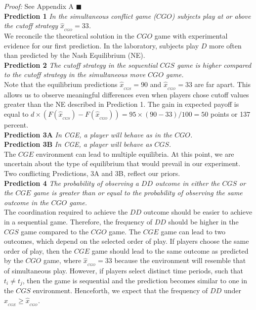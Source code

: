 \documentclass[11pt, letterpaper]{article}
\theoremstyle{plain}
\begin{document}
\noindent \textit{Proof:} See Appendix A $\blacksquare$
\\

\noindent \textbf{Prediction 1}
\textit{In the simultaneous conflict game ($CGO$) subjects play at or above the cutoff strategy $\hat{x}_{_{CGO}}=33$.}\\

We reconcile the theoretical solution in the $CGO$ game with experimental evidence for our first prediction. In the laboratory, subjects play $D$ more often than predicted by the Nash Equilibrium (NE). \\

\noindent \textbf{Prediction 2}
\textit{The cutoff strategy in the sequential $CGS$ game is higher compared to the cutoff strategy in the simultaneous move $CGO$ game.}\\

Note that the equilibrium predictions $\hat{x}_{_{CGS}}=90$ and $\hat{x}_{_{CGO}}=33$ are far apart. This allows us to observe meaningful differences even when players chose cutoff values greater than the NE described in Prediction 1. The gain in expected payoff is equal to $d\times \left( F(\hat{x}_{_{CGS}})-F(\hat{x}_{_{CGO}}) \right)=95\times( 90-33)/100=50$ points or 137 percent. \\

\noindent \textbf{Prediction 3A} \textit{In CGE, a player will behave as in the $CGO$. }\\
\noindent \textbf{Prediction 3B} \textit{In CGE, a player will behave as $CGS$.}\\

The $CGE$ environment can lead to multiple equilibria. At this point, we are uncertain about the type of equilibrium that would prevail in our experiment. Two conflicting Predictions, 3A and 3B, reflect our priors. \\

\noindent \textbf{Prediction 4}
\textit{The probability of observing a $DD$ outcome in either the $CGS$ or the $CGE$ game is greater than or equal to the probability of observing the same outcome in the $CGO$ game.}\\

The coordination required to achieve the $DD$ outcome should be easier to achieve in a sequential game. Therefore, the frequency of $DD$ should be higher in the $CGS$ game compared to the $CGO$ game. The $CGE$ game can lead to two outcomes, which depend on the selected order of play. If players choose the same order of play, then the $CGE$ game should lead to the same outcome as predicted by the $CGO$ game, where $\hat{x}_{_{CGO}}=33$ because the environment will resemble that of simultaneous play. However, if players select distinct time periods, such that $t_i\neq t_j$, then the game is sequential and the prediction becomes similar to one in the $CGS$ environment.  Henceforth, we expect that the frequency of $DD$ under $\hat{x}_{_{CGE}}\geq \hat{x}_{_{CGO}}$.  \\
\end{document}
